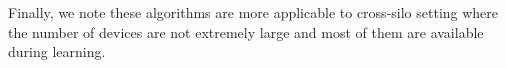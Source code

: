 \documentclass[twoside]{article}
\begin{document}
%
%
%
%
Finally, we note these algorithms are more applicable to cross-silo setting where the number of devices are not extremely large and most of them are available during learning.



\vspace{-0.05in}
\end{document}

